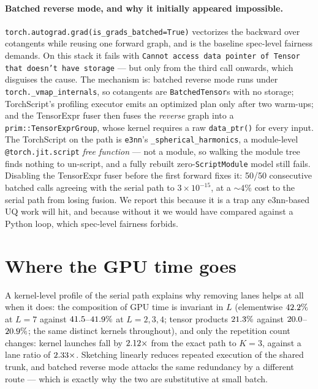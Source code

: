 \documentclass{article}
\begin{document}
\paragraph{Batched reverse mode, and why it initially appeared impossible.}
\texttt{torch.autograd.grad(is\_grads\_batched=True)} vectorizes the backward over cotangents while
reusing one forward graph, and is the baseline spec-level fairness demands. On this stack it fails
with \texttt{Cannot access data pointer of Tensor that doesn't have storage} --- but only from the
third call onwards, which disguises the cause. The mechanism is: batched reverse mode runs under
\texttt{torch.\_vmap\_internals}, so cotangents are \texttt{BatchedTensor}s with no storage;
TorchScript's profiling executor emits an optimized plan only after two warm-ups; and the TensorExpr
fuser then fuses the \emph{reverse} graph into a \texttt{prim::TensorExprGroup}, whose kernel
requires a raw \texttt{data\_ptr()} for every input. The TorchScript on the path is
\texttt{e3nn}'s \texttt{\_spherical\_harmonics}, a module-level \texttt{@torch.jit.script}
\emph{free function} --- not a module, so walking the module tree finds nothing to un-script, and a
fully rebuilt zero-\texttt{ScriptModule} model still fails. Disabling the TensorExpr fuser before
the first forward fixes it: 50/50 consecutive batched calls agreeing with the serial path to
$3\times10^{-15}$, at a $\sim\!4\%$ cost to the serial path from losing fusion. We report this
because it is a trap any e3nn-based UQ work will hit, and because without it we would have compared
against a Python loop, which spec-level fairness forbids.


\section{Where the GPU time goes}
\label{app:kernels}
A kernel-level profile of the serial path explains why removing lanes helps at all when it does: the
composition of GPU time is invariant in $L$ (elementwise $42.2\%$ at $L{=}7$ against
$41.5$--$41.9\%$ at $L{=}2,3,4$; tensor products
$21.3\%$ against $20.0$--$20.9\%$; the same \fsKernDistinct{}
distinct kernels throughout), and only the repetition count changes: kernel launches fall by
$2.12\times$ from the exact path to $K{=}3$, against a lane ratio of
$2.33\times$. Sketching linearly reduces repeated execution of the shared trunk, and
batched reverse mode attacks the same redundancy by a different route --- which is exactly why the
two are substitutive at small batch.
\end{document}
